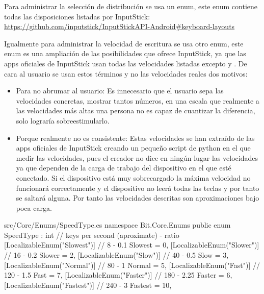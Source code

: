 Para administrar la selección de distribución se usa un enum, este enum contiene todas las disposiciones listadas por InputStick:
\noindent\url{https://github.com/inputstick/InputStickAPI-Android#keyboard-layouts}
\begin{csharp}[firstnumber=3]{src/Core/Enums/LayoutType.cs}
namespace Bit.Core.Enums
{
    public enum LayoutType
    {
        [LocalizableEnum("AutoTyperLayoutCSCZ")]
        cs_CZ = 0,
        [LocalizableEnum("AutoTyperLayoutDADK")]
        da_DK = 1,
...
\end{csharp}

Igualmente para administrar la velocidad de escritura se usa otro enum, este enum es una ampliación de las posibilidades que ofrece InputStick, ya que las apps oficiales de InputStick usan todas las velocidades listadas excepto  y . De cara al usuario se usan estos términos y no las velocidades reales dos motivos:
\begin{itemize}
    \item Para no abrumar al usuario: Es innecesario que el usuario sepa las velocidades concretas, mostrar tantos números, en una escala que realmente a las velocidades más altas una persona no es capaz de cuantizar la diferencia, solo lograría sobreestimularlo.
    \item Porque realmente no es consistente: Estas velocidades se han extraído de las apps oficiales de InputStick creando un pequeño script de python en el que medir las velocidades, pues el creador no dice en ningún lugar las velocidades ya que dependen de la carga de trabajo del dispositivo en el que esté conectado. Si el dispositivo está muy sobrecargado la máxima velocidad no funcionará correctamente y el dispositivo no leerá todas las teclas y por tanto se saltará alguna. Por tanto las velocidades descritas son aproximaciones bajo poca carga.
\end{itemize}
\begin{csharp}[firstnumber=3]{src/Core/Enums/SpeedType.cs}
namespace Bit.Core.Enums
{
    public enum SpeedType : int         // keys per second (aproximate) - ratio
    {
        [LocalizableEnum("Slowest")]    // 8 - 0.1
        Slowest = 0,
        [LocalizableEnum("Slower")]     // 16 - 0.2
        Slower = 2,
        [LocalizableEnum("Slow")]       // 40 - 0.5
        Slow = 3,
        [LocalizableEnum("Normal")]     // 80 - 1
        Normal = 5,
        [LocalizableEnum("Fast")]       // 120 - 1.5
        Fast = 7,
        [LocalizableEnum("Faster")]     // 180 - 2.25
        Faster = 6,
        [LocalizableEnum("Fastest")]    // 240 - 3
        Fastest = 10,                   
    }
}
\end{csharp}
\newpage
